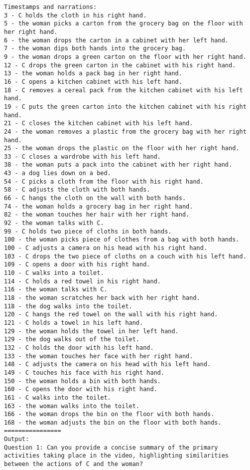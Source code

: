 \begin{lstlisting}
Timestamps and narrations:
3 - C holds the cloth in his right hand.
5 - the woman picks a carton from the grocery bag on the floor with her right hand.
6 - the woman drops the carton in a cabinet with her left hand.
7 - the woman dips both hands into the grocery bag.
9 - the woman drops a green carton on the floor with her right hand.
12 - C drops the green carton in the cabinet with his right hand.
13 - the woman holds a pack bag in her right hand.
16 - C opens a kitchen cabinet with his left hand.
18 - C removes a cereal pack from the kitchen cabinet with his left hand.
19 - C puts the green carton into the kitchen cabinet with his right hand.
21 - C closes the kitchen cabinet with his left hand.
24 - the woman removes a plastic from the grocery bag with her right hand.
25 - the woman drops the plastic on the floor with her right hand.
33 - C closes a wardrobe with his left hand.
38 - the woman puts a pack into the cabinet with her right hand.
43 - a dog lies down on a bed.
54 - C picks a cloth from the floor with his right hand.
58 - C adjusts the cloth with both hands.
66 - C hangs the cloth on the wall with both hands.
74 - the woman holds a grocery bag in her right hand.
82 - the woman touches her hair with her right hand.
92 - the woman talks with C.
99 - C holds two piece of cloths in both hands.
100 - the woman picks piece of clothes from a bag with both hands.
100 - C adjusts a camera on his head with his right hand.
103 - C drops the two piece of cloths on a couch with his left hand.
109 - C opens a door with his right hand.
110 - C walks into a toilet.
114 - C holds a red towel in his right hand.
116 - the woman talks with C.
118 - the woman scratches her back with her right hand.
118 - the dog walks into the toilet.
120 - C hangs the red towel on the wall with his right hand.
121 - C holds a towel in his left hand.
129 - the woman holds the towel in her left hand.
129 - the dog walks out of the toilet.
132 - C holds the door with his left hand.
133 - the woman touches her face with her right hand.
148 - C adjusts the camera on his head with his left hand.
149 - C touches his face with his right hand.
150 - the woman holds a bin with both hands.
160 - C opens the door with his right hand.
161 - C walks into the toilet.
163 - the woman walks into the toilet.
166 - the woman drops the bin on the floor with both hands.
168 - the woman adjusts the bin on the floor with both hands.
================
Output:
Question 1: Can you provide a concise summary of the primary activities taking place in the video, highlighting similarities between the actions of C and the woman?


\end{lstlisting}
